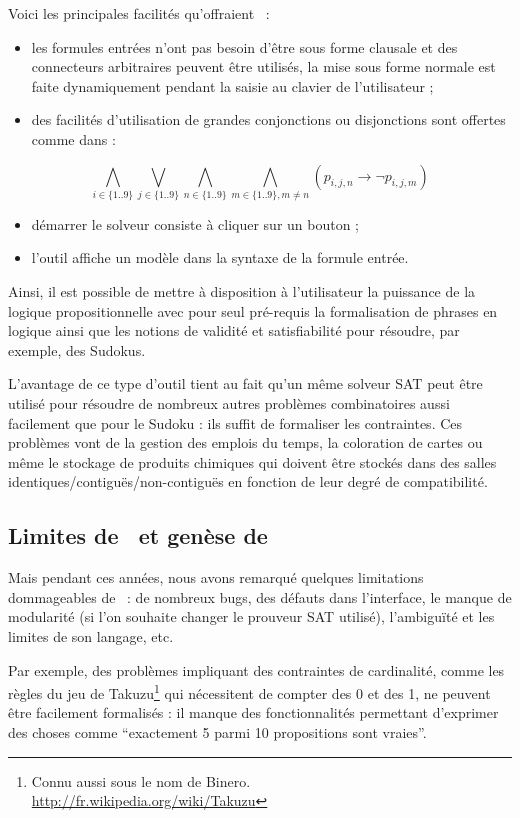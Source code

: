 Voici les principales facilités qu'offraient \satoulouse\ :
\begin{itemize}
\item les formules entrées n'ont pas besoin d'être sous forme clausale et des connecteurs arbitraires peuvent être utilisés, la mise sous forme normale est faite dynamiquement pendant la saisie au clavier de l'utilisateur ;
\item des facilités d'utilisation de grandes conjonctions ou disjonctions sont offertes comme dans :
\end{itemize}
  \[\bigwedge_{i\in\{1..9\}}
  \bigvee_{j\in\{1..9\}}\bigwedge_{n\in\{1..9\}}\bigwedge_{m\in\{1..9\},m\neq
    n}(p_{i,j,n}\rightarrow \lnot p_{i,j,m})\]
\begin{itemize}
\item démarrer le solveur consiste à cliquer sur un bouton ;
\item l'outil affiche un modèle dans la syntaxe de la formule entrée.
\end{itemize}
Ainsi, il est possible de mettre à disposition à l'utilisateur la puissance de la logique propositionnelle avec pour seul pré-requis la formalisation de phrases en logique ainsi que les notions de validité et satisfiabilité pour résoudre, par exemple, des Sudokus.\

L'avantage de ce type d'outil tient au fait qu'un même solveur SAT peut être utilisé pour résoudre de nombreux autres problèmes combinatoires aussi facilement que pour le Sudoku : ils suffit de formaliser les contraintes. Ces problèmes vont de la gestion des emplois du temps, la coloration de cartes ou même le stockage de produits chimiques qui doivent être stockés dans des salles identiques/contiguës/non-contiguës en fonction de leur degré de compatibilité.

\subsection{Limites de \satoulouse\ et genèse de \touist}
Mais pendant ces années, nous avons remarqué quelques limitations dommageables de \satoulouse\ : de nombreux bugs, des défauts dans l'interface, le manque de modularité (si l'on souhaite changer le prouveur SAT utilisé), l'ambiguïté et les limites de son langage, etc.

Par exemple, des problèmes impliquant des contraintes de cardinalité, comme les règles du jeu de Takuzu\footnote{Connu aussi sous le nom de Binero.\\ \url{http://fr.wikipedia.org/wiki/Takuzu}} qui nécessitent de compter des 0 et des 1, ne peuvent être facilement formalisés : il manque des fonctionnalités permettant d'exprimer des choses comme ``exactement 5 parmi 10 propositions sont vraies''. 

